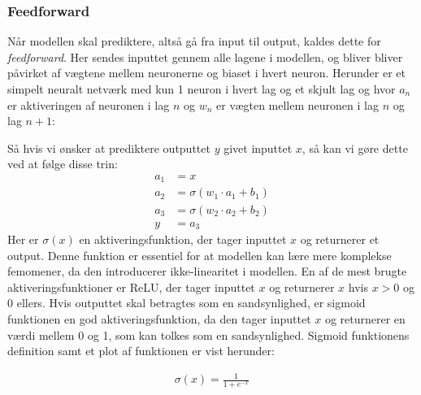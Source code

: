 \documentclass{article}
\begin{document}
\subsubsection{Feedforward}
Når modellen skal prediktere, altså gå fra input til output, kaldes dette for \textit{feedforward}. Her sendes inputtet gennem alle lagene i modellen, og bliver bliver påvirket af vægtene mellem neuronerne og biaset i hvert neuron. Herunder er et simpelt neuralt netværk med kun 1 neuron i hvert lag og et skjult lag og hvor $a_n$ er aktiveringen af neuronen i lag $n$ og $w_n$ er vægten mellem neuronen i lag $n$ og lag $n+1$:
\begin{center}

\label{fig:neural_network2}
\end{center}
Så hvis vi ønsker at prediktere outputtet $y$ givet inputtet $x$, så kan vi gøre dette ved at følge disse trin: \\
\begin{align}
a_1 &= x
\\
a_2 &= \sigma(w_1 \cdot a_1 + b_1)
\\
a_3 &= \sigma(w_2 \cdot a_2 + b_2)
\\
y &= a_3
\end{align}
Her er $\sigma(x)$ en aktiveringsfunktion, der tager inputtet $x$ og returnerer et output. Denne funktion er essentiel for at modellen kan lære mere komplekse femomener, da den introducerer ikke-linearitet i modellen. En af de mest brugte aktiveringsfunktioner er ReLU, der tager inputtet $x$ og returnerer $x$ hvis $x > 0$ og 0 ellers. \parencite{Sanderson_2017} Hvis outputtet skal betragtes som en sandsynlighed, er sigmoid funktionen en god aktiveringsfunktion, da den tager inputtet $x$ og returnerer en værdi mellem 0 og 1, som kan tolkes som en sandsynlighed. Sigmoid funktionens definition samt et plot af funktionen er vist herunder: \parencite{Nielsen_2019a}\\
\begin{minipage}{0.4\textwidth}
  \begin{align}
    \sigma(x) = \frac{1}{1 + e^{-x}}
  \end{align}
\end{minipage}
\begin{minipage}{0.6\textwidth}
  \begin{center}
    \label{fig:sigmoid}
  \end{center}
\end{minipage}
\end{document}
